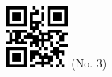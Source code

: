 \documentclass[twocolumn]{article}
\title{}
\date{}
\begin{document}

\begin{center}
 \hspace{0.2cm}
 \includegraphics[width=2cm]{qrcode-3.png}
 \hspace{0.5cm}
 \Large{  (No. 3) }
\end{center}


\end{document}

